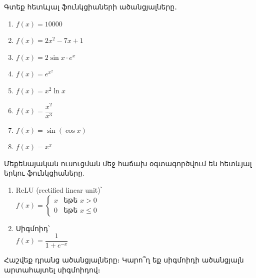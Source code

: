 \begin{problem}
Գտեք հետևյալ ֆունկցիաների ածանցյալները․
\begin{enumerate}[label={\alph*}․]
\item $f(x)=10000$
\item $f(x)=2x^2-7x+1$
\item $f(x)=2\sin x \cdot e^x$
\item $f(x)=e^{x^2}$
\item $f(x)=x^2\ln x$
\item $f(x)=\dfrac{x^2}{x^3}$
\item $f(x)=\sin(\cos x)$
\item $f(x)=x^x$
\end{enumerate}
\end{problem}

\begin{problem}
Մեքենայական ուսուցման մեջ հաճախ օգտագործվում են հետևյալ երկու ֆունկցիաները.
\begin{enumerate}[label={\alph*}․]
\item {\rm ReLU (rectified linear unit)}՝
\\ $f(x) = \begin{cases}
    x & \text{եթե } x>0\\
    0 & \text{եթե } x\le 0
\end{cases}$

\begin{center}
\end{center}

\item Սիգմոիդ՝
\\ $f(x) = \dfrac{1}{1+e^{-x}}$

\begin{center}
\end{center}

\end{enumerate}

Հաշվեք դրանց ածանցյալները։ Կարո՞ղ եք սիգմոիդի ածանցյալն արտահայտել սիգմոիդով։
    
\end{problem}


